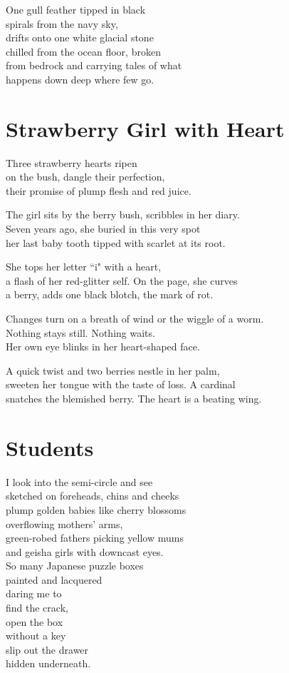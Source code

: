 \documentclass[twoside,10pt]{book}
\begin{document}
One gull feather tipped in black\\
spirals from the navy sky,\\
drifts onto one white glacial stone\\
chilled from the ocean floor, broken\\
from bedrock and carrying tales of what\\
happens down deep where few go.


\clearpage
\section{Strawberry Girl with Heart}

Three strawberry hearts ripen\\
on the bush, dangle their perfection,\\
their promise of plump flesh and red juice.

The girl sits by the berry bush, scribbles in her diary.\\
Seven years ago, she buried in this very spot\\
her last baby tooth tipped with scarlet at its root.

She tops her letter ``i" with a heart,\\
a flash of her red-glitter self. On the page, she curves\\
a berry, adds one black blotch, the mark of rot.

Changes turn on a breath of wind or the wiggle of a worm.\\
Nothing stays still. Nothing waits.\\
Her own eye blinks in her heart-shaped face.

A quick twist and two berries nestle in her palm,\\
sweeten her tongue with the taste of loss. A cardinal\\
snatches the blemished berry. The heart is a beating wing.


\clearpage
\section{Students}

I look into the semi-circle and see\\
sketched on foreheads, chins and cheeks\\
plump golden babies like cherry blossoms\\
overflowing mothers' arms,\\
green-robed fathers picking yellow mums\\
and geisha girls with downcast eyes.\\
So many Japanese puzzle boxes\\
painted and lacquered\\
daring me to\\
find the crack,\\
open the box\\
without a key\\
slip out the drawer\\
hidden underneath.
\end{document}
